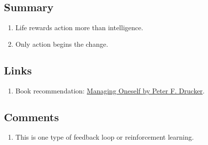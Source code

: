 \documentclass[a4paper,12pt]{article}
\begin{document}
\subsection*{ Summary }

\begin{enumerate}

	\item Life rewards action more than intelligence.
	
	\item Only action begins the change.

\end{enumerate}



\subsection*{ Links }

\begin{enumerate}

	\item Book recommendation: \href{https://www.goodreads.com/book/show/2477223.Managing_Oneself}{Managing Oneself by Peter F. Drucker}.

\end{enumerate}


\subsection*{ Comments }

\begin{enumerate}

	\item This is one type of feedback loop or reinforcement learning.

\end{enumerate}



\newpage
\end{document}
